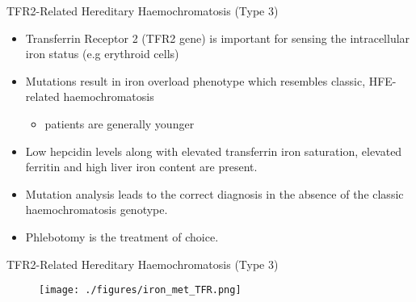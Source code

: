\documentclass[presentation, smaller]{beamer}
\begin{document}
\begin{frame}[label={sec:orgbe3cdd6}]{TFR2-Related Hereditary Haemochromatosis (Type 3)}
\begin{itemize}
\item Transferrin Receptor 2 (TFR2 gene) is important for sensing the
intracellular iron status (e.g erythroid cells)
\item Mutations result in iron overload phenotype which resembles classic, HFE-related haemochromatosis
\begin{itemize}
\item patients are generally younger
\end{itemize}
\item Low hepcidin levels along with elevated transferrin iron saturation,
elevated ferritin and high liver iron content are present.
\item Mutation analysis leads to the correct diagnosis in the absence of
the classic haemochromatosis genotype.
\item Phlebotomy is the treatment of choice.
\end{itemize}
\end{frame}

\begin{frame}[label={sec:org8239d4b}]{TFR2-Related Hereditary Haemochromatosis (Type 3)}
\begin{figure}[htbp]
\centering
\texttt{[image: ./figures/iron\_met\_TFR.png]}
\label{fig:orgb36d084}
\end{figure}
\end{frame}
\end{document}
